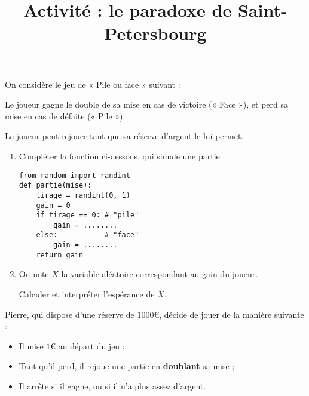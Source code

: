 \documentclass[
	classe=$2^{de}$
]{informatique}
\begin{document}
\title{Activité : le paradoxe de Saint-Petersbourg}
\maketitle

On considère le jeu de « Pile ou face » suivant :
\begin{tcolorbox}
	Le joueur gagne le double de sa mise en cas de victoire (« Face »), et perd sa mise en cas de défaite (« Pile »).

	Le joueur peut rejouer tant que sa réserve d'argent le lui permet.
\end{tcolorbox}

\begin{enumerate}
	\item Compléter la fonction ci-dessous, qui simule une partie :
	      \begin{lstlisting}
from random import randint
def partie(mise):
	tirage = randint(0, 1)
	gain = 0
	if tirage == 0: # "pile"
		gain = ........
	else:           # "face"
		gain = ........
	return gain
\end{lstlisting}
	\item On note $X$ la variable aléatoire correspondant au gain du joueur.

	      Calculer et interpréter l'espérance de $X$. 
\end{enumerate}
\begin{tcolorbox}
	Pierre, qui dispose d'une réserve de $1000$€, décide de jouer de la manière suivante :
	\begin{itemize}
		\item Il mise $1$€ au départ du jeu ;
		\item Tant qu'il perd, il rejoue une partie en \textbf{doublant} sa mise ;
		\item Il arrête si il gagne, ou si il n'a plus assez d'argent.
	\end{itemize}
\end{tcolorbox}
\end{document}
